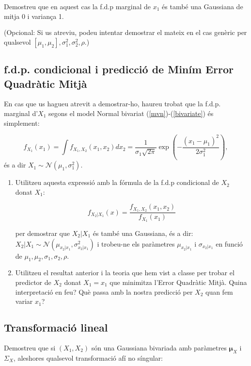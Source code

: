 \documentclass[10pt,a4paper]{article}
\begin{document}
Demostreu que en aquest cas la f.d.p  marginal de $x_1$ és també una Gaussiana de mitja 0 i variança 1. 

(Opcional: Si us atreviu, podeu intentar demostrar el mateix en el cas genèric per qualsevol $[\mu_1, \mu_2], \sigma_1^2,  \sigma_2^2 , \rho$.)

\subsection{f.d.p. condicional i predicció de Miním Error Quadràtic Mitjà}

En cas que us hagueu atrevit a demostrar-ho, haureu trobat que la f.d.p. marginal d'$X_1$ 
segons el model Normal bivariat (\ref{mvn})-(\ref{bivariate}) és simplement:

\begin{equation}
f_{X_1}(x_1) = \int f_{X_1, X_2}(x_1, x_2) dx_2 = \frac{1}{\sigma_1 \sqrt{2\pi}}\exp\left(-\frac{\left(x_1 - \mu_1\right)^2}{2\sigma_1^2}\right),
\end{equation}
és a dir $X_1 \sim \mathcal{N}(\mu_1, \sigma_1^2)$.

\begin{enumerate}
\item Utilitzeu aquesta expressió amb la fórmula de la f.d.p condicional de $X_2$ donat $X_1$:

\begin{equation}
f_{X_2 | X_1} (x) = \frac{f_{X_1,X_2}(x_1, x_2)}{f_{X_1}(x_1)}
\end{equation}

per demostrar que $X_2 | X_1$ és també una Gaussiana, és a dir: $X_2 | X_1 \sim \mathcal{N}(\mu_{x_2|x_1}, \sigma_{x_2|x_1}^2 )$ i trobeu-ne els paràmetres  $\mu_{x_2|x_1} $ i  $\sigma_{x_2|x_1}$ en funció de
$\mu_1, \mu_2, \sigma_1, \sigma_2, \rho$.

\item Utilitzeu el resultat anterior i la teoria que hem vist a classe per trobar el predictor de $X_2$ donat $X_1=x_1$ que minimitza l'Error Quadràtic Mitjà. Quina interpretació en feu? Què passa amb la nostra predicció per $X_2$ quan fem variar $x_1$?
\end{enumerate}

\subsection{Transformació lineal}

Demostreu que si $(X_1, X_2)$ són una Gaussiana bivariada amb paràmetres $\mathbf{\mu}_X$ i $\Sigma_X$, aleshores qualsevol
transformació afí no síngular:
\end{document}
